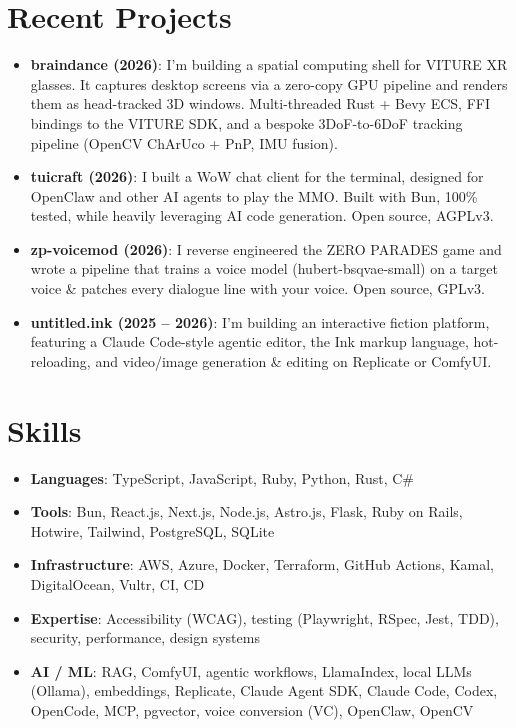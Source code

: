 \documentclass[11pt]{article}
\newcommand{\resumeItem}[2]{
\item\small{
    \textbf{#1}{: #2 \vspace{-2pt}}
  }
}
\newcommand{\resumeSubHeadingListStart}{
\begin{itemize}[leftmargin=*, topsep=0pt, itemsep=6pt, parsep=0pt]}
\newcommand{\resumeSubHeadingListEnd}{
\end{itemize}}
\begin{document}
\section{Recent Projects}
\resumeSubHeadingListStart


\resumeItem{braindance (2026)}
{I'm building a spatial computing shell for VITURE XR glasses. It captures
desktop screens via a zero-copy GPU pipeline and renders them as head-tracked 3D
windows. Multi-threaded Rust + Bevy ECS, FFI bindings to the VITURE SDK, and a
bespoke 3DoF-to-6DoF tracking pipeline (OpenCV ChArUco + PnP, IMU fusion).}

\resumeItem{tuicraft (2026)}
{I built a WoW chat client for the terminal, designed for OpenClaw and other AI
agents to play the MMO. Built with Bun, 100\% tested, while heavily leveraging
AI code generation. Open source, AGPLv3.}

\resumeItem{zp-voicemod (2026)}
{I reverse engineered the ZERO PARADES game and wrote a pipeline that trains a
voice model (hubert-bsqvae-small) on a target voice \& patches every dialogue
line with your voice. Open source, GPLv3.}

\resumeItem{untitled.ink (2025 -- 2026)}
{I'm building an interactive fiction platform, featuring a Claude Code-style
agentic editor, the Ink markup language, hot-reloading, and video/image
generation \& editing on Replicate or ComfyUI.}

\resumeSubHeadingListEnd

\section{Skills}
\resumeSubHeadingListStart

\resumeItem{Languages}
{TypeScript, JavaScript, Ruby, Python, Rust, C\#}

\resumeItem{Tools}
{Bun, React.js, Next.js, Node.js, Astro.js, Flask, Ruby on Rails, Hotwire,
Tailwind, PostgreSQL, SQLite}

\resumeItem{Infrastructure}
{AWS, Azure, Docker, Terraform, GitHub Actions, Kamal, DigitalOcean, Vultr, CI,
CD}

\resumeItem{Expertise}
{Accessibility (WCAG), testing (Playwright, RSpec, Jest, TDD), security,
performance, design systems}

\resumeItem{AI / ML}
{RAG, ComfyUI, agentic workflows, LlamaIndex, local LLMs (Ollama), embeddings,
Replicate, Claude Agent SDK, Claude Code, Codex, OpenCode, MCP, pgvector, voice
conversion (VC), OpenClaw, OpenCV}

\resumeSubHeadingListEnd
\end{document}
